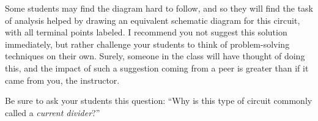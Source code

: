 





Some students may find the diagram hard to follow, and so they will find the task of analysis helped by drawing an equivalent schematic diagram for this circuit, with all terminal points labeled.  I recommend you not suggest this solution immediately, but rather challenge your students to think of problem-solving techniques on their own.  Surely, someone in the class will have thought of doing this, and the impact of such a suggestion coming from a peer is greater than if it came from you, the instructor.

Be sure to ask your students this question: ``Why is this type of circuit commonly called a {\it current divider}?''




